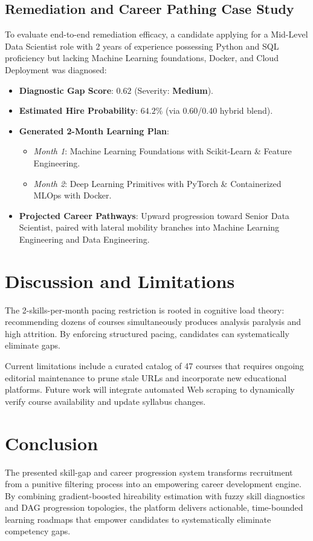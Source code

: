 \documentclass[conference]{IEEEtran}
\begin{document}
\subsection{Remediation and Career Pathing Case Study}
To evaluate end-to-end remediation efficacy, a candidate applying for a Mid-Level Data Scientist role with 2 years of experience possessing Python and SQL proficiency but lacking Machine Learning foundations, Docker, and Cloud Deployment was diagnosed:
\begin{itemize}
    \item \textbf{Diagnostic Gap Score}: $0.62$ (Severity: \textbf{Medium}).
    \item \textbf{Estimated Hire Probability}: $64.2\%$ (via 0.60/0.40 hybrid blend).
    \item \textbf{Generated 2-Month Learning Plan}:
    \begin{itemize}
        \item \textit{Month 1}: Machine Learning Foundations with Scikit-Learn \& Feature Engineering.
        \item \textit{Month 2}: Deep Learning Primitives with PyTorch \& Containerized MLOps with Docker.
    \end{itemize}
    \item \textbf{Projected Career Pathways}: Upward progression toward Senior Data Scientist, paired with lateral mobility branches into Machine Learning Engineering and Data Engineering.
\end{itemize}

\section{Discussion and Limitations}
The 2-skills-per-month pacing restriction is rooted in cognitive load theory: recommending dozens of courses simultaneously produces analysis paralysis and high attrition. By enforcing structured pacing, candidates can systematically eliminate gaps.

Current limitations include a curated catalog of 47 courses that requires ongoing editorial maintenance to prune stale URLs and incorporate new educational platforms. Future work will integrate automated Web scraping to dynamically verify course availability and update syllabus changes.

\section{Conclusion}
The presented skill-gap and career progression system transforms recruitment from a punitive filtering process into an empowering career development engine. By combining gradient-boosted hireability estimation with fuzzy skill diagnostics and DAG progression topologies, the platform delivers actionable, time-bounded learning roadmaps that empower candidates to systematically eliminate competency gaps.
\end{document}
